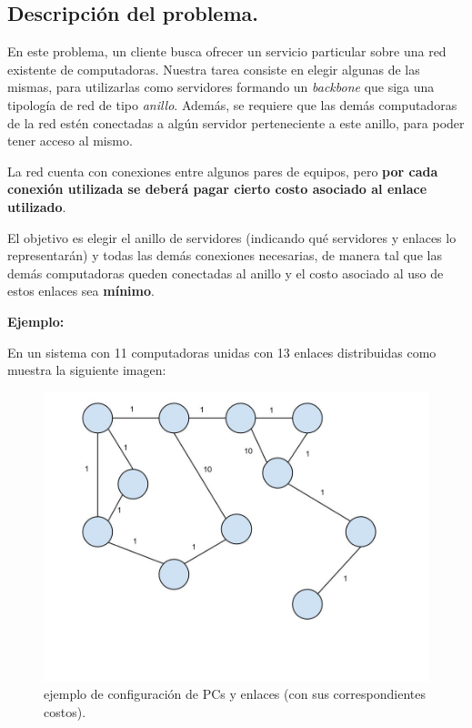 \subsection{Descripción del problema.}

\vspace*{0.3cm}

En este problema, un cliente busca ofrecer un servicio particular sobre una
red existente de computadoras. Nuestra tarea consiste en elegir algunas de las
mismas, para utilizarlas como servidores formando un \textit{backbone} que
siga una tipología de red de tipo \textit{anillo}. Además, se requiere que
las demás computadoras de la red estén conectadas a algún servidor
perteneciente a este anillo, para poder tener acceso al mismo.

La red cuenta con conexiones entre algunos pares de equipos, pero
\textbf{por cada conexión utilizada se deberá pagar cierto costo
asociado al enlace utilizado}.

\medskip

El objetivo es elegir el anillo de servidores (indicando qué servidores y
enlaces lo representarán) y todas las demás conexiones necesarias, de
manera tal que las demás computadoras queden conectadas al anillo y el costo
asociado al uso de estos enlaces sea \textbf{mínimo}.

\vspace*{0.5cm}

\textbf{Ejemplo:}

En un sistema con 11 computadoras unidas con 13 enlaces distribuidas como
muestra la siguiente imagen:

\begin{figure}[htb]
  \begin{center}
      \includegraphics[scale=0.25]{imagenes/anillo-sin-hacer.jpg}
  \end{center}
  \caption{ejemplo de configuración de PCs y enlaces (con sus correspondientes costos).}
\end{figure}

